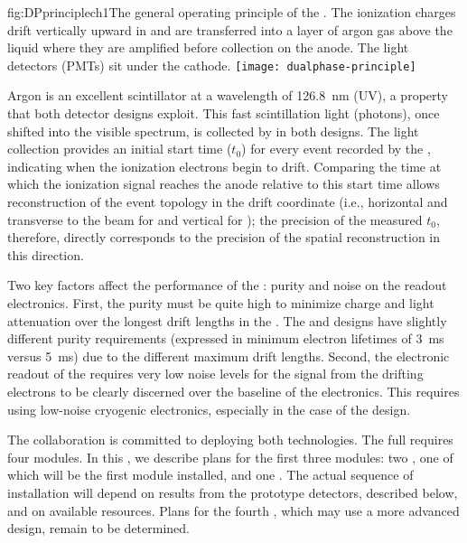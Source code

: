 \begin{dunefigure}{fig:DPprinciplech1}{The general operating principle of the  . The ionization charges drift vertically upward in  and are transferred into a layer of argon gas above the liquid where they are amplified before collection on the anode. The light detectors (PMTs) sit under the cathode.}
\texttt{[image: dualphase-principle]}
\end{dunefigure}


Argon is an excellent scintillator at a wavelength of \SI{126.8}{\nano\meter} (UV), a property that both detector designs exploit. This fast scintillation light (photons), once shifted into the visible spectrum, is collected by  in both designs. The light collection provides an initial start time ($t_{0}$) for every event recorded by the , indicating when the ionization electrons begin to drift. Comparing the time at which the ionization signal reaches the anode relative to this start time allows reconstruction of the event topology in the drift coordinate (i.e., horizontal and transverse to the beam for  and vertical for ); the precision of the measured $t_{0}$, therefore, directly corresponds to the precision of the spatial reconstruction in this direction. 

Two key factors affect the performance of the  :  purity and noise on the readout electronics.  First, the  purity must be %
quite high to minimize charge and light attenuation over the longest drift lengths in the .  %
The  and  designs have slightly different purity requirements (expressed in minimum electron lifetimes of \SI{3}{ms} versus \SI{5}{ms}) due to the different maximum drift lengths.
%
Second, the electronic readout of the  requires very low noise levels for the signal from the drifting electrons to be clearly discerned over the baseline of the electronics.  This requires using low-noise cryogenic electronics, especially in the case of the  design.

The  collaboration is committed to deploying both technologies. The full   requires four modules. In this , we describe plans for the first three modules: two , one of which will be the first module installed, and one . %
The actual sequence of  installation will depend on results from the prototype detectors, described below, and on available resources. Plans for the fourth , which may use a more advanced design, remain to be determined. 

